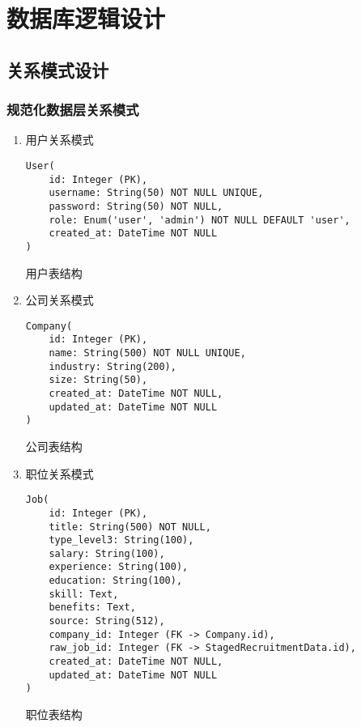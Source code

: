 \section{数据库逻辑设计}

\subsection{关系模式设计}

\subsubsection{规范化数据层关系模式}




\begin{enumerate}
  \item 用户关系模式
  \begin{listing}[htbp]
    \begin{verbatim}
User(
    id: Integer (PK),
    username: String(50) NOT NULL UNIQUE,
    password: String(50) NOT NULL,
    role: Enum('user', 'admin') NOT NULL DEFAULT 'user',
    created_at: DateTime NOT NULL
)
    \end{verbatim}
    \caption{用户表结构}\label{lst:user_schema}
  \end{listing}

  \item 公司关系模式
  \begin{listing}[htbp]
    \begin{verbatim}
Company(
    id: Integer (PK),
    name: String(500) NOT NULL UNIQUE,
    industry: String(200),
    size: String(50),
    created_at: DateTime NOT NULL,
    updated_at: DateTime NOT NULL
)
    \end{verbatim}
    \caption{公司表结构}\label{lst:company_schema}
  \end{listing}

  \item 职位关系模式
  \begin{listing}[htbp]
    \begin{verbatim}
Job(
    id: Integer (PK),
    title: String(500) NOT NULL,
    type_level3: String(100),
    salary: String(100),
    experience: String(100),
    education: String(100),
    skill: Text,
    benefits: Text,
    source: String(512),
    company_id: Integer (FK -> Company.id),
    raw_job_id: Integer (FK -> StagedRecruitmentData.id),
    created_at: DateTime NOT NULL,
    updated_at: DateTime NOT NULL
)
    \end{verbatim}
    \caption{职位表结构}\label{lst:job_schema}
  \end{listing}


\end{enumerate}
